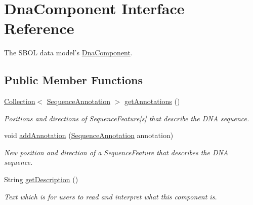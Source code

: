 \hypertarget{interfaceorg_1_1sbolstandard_1_1core_1_1_dna_component}{
\section{DnaComponent Interface Reference}
\label{interfaceorg_1_1sbolstandard_1_1core_1_1_dna_component}
}


The SBOL data model's \hyperlink{interfaceorg_1_1sbolstandard_1_1core_1_1_dna_component}{DnaComponent}.  


\subsection*{Public Member Functions}
\begin{DoxyCompactItemize}
\item 
\hyperlink{interfaceorg_1_1sbolstandard_1_1core_1_1_collection}{Collection}$<$ \hyperlink{interfaceorg_1_1sbolstandard_1_1core_1_1_sequence_annotation}{SequenceAnnotation} $>$ \hyperlink{interfaceorg_1_1sbolstandard_1_1core_1_1_dna_component_a0275a8297f992718e6fe7c8638c14010}{getAnnotations} ()
\begin{DoxyCompactList}\small\item\em Positions and directions of {\ttfamily SequenceFeature}\mbox{[}s\mbox{]} that describe the DNA sequence. \item\end{DoxyCompactList}\item 
void \hyperlink{interfaceorg_1_1sbolstandard_1_1core_1_1_dna_component_a642b2e7e1064f8f55a741e3d2945261f}{addAnnotation} (\hyperlink{interfaceorg_1_1sbolstandard_1_1core_1_1_sequence_annotation}{SequenceAnnotation} annotation)
\begin{DoxyCompactList}\small\item\em New position and direction of a {\ttfamily SequenceFeature} that describes the DNA sequence. \item\end{DoxyCompactList}\item 
String \hyperlink{interfaceorg_1_1sbolstandard_1_1core_1_1_dna_component_ac7feffb7a33f63504ff1f87f19e2d2d8}{getDescription} ()
\begin{DoxyCompactList}\small\item\em Text which is for users to read and interpret what this component is. \item\end{DoxyCompactList}\item 

\end{DoxyCompactItemize}
